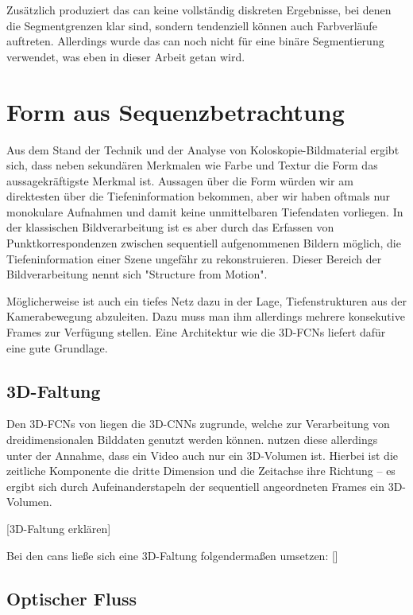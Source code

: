 Zusätzlich produziert das \gls{can} keine vollständig diskreten Ergebnisse, bei denen die Segmentgrenzen klar sind, sondern tendenziell können auch Farbverläufe auftreten.
Allerdings wurde das \gls{can} noch nicht für eine binäre Segmentierung verwendet, was eben in dieser Arbeit getan wird.



\section{Form aus Sequenzbetrachtung}

Aus dem Stand der Technik und der Analyse von Koloskopie-Bildmaterial ergibt sich, dass neben sekundären Merkmalen wie Farbe und Textur die Form das aussagekräftigste Merkmal ist.
Aussagen über die Form würden wir am direktesten über die Tiefeninformation bekommen, aber wir haben oftmals nur monokulare Aufnahmen und damit keine unmittelbaren Tiefendaten vorliegen.
In der klassischen Bildverarbeitung ist es aber durch das Erfassen von Punktkorrespondenzen zwischen sequentiell aufgenommenen Bildern möglich, die Tiefeninformation einer Szene ungefähr zu rekonstruieren.
Dieser Bereich der Bildverarbeitung nennt sich "Structure from Motion".

Möglicherweise ist auch ein tiefes Netz dazu in der Lage, Tiefenstrukturen aus der Kamerabewegung abzuleiten.
Dazu muss man ihm allerdings mehrere konsekutive Frames zur Verfügung stellen.
Eine Architektur wie die 3D-FCNs liefert dafür eine gute Grundlage.

\subsection{3D-Faltung}

Den 3D-FCNs von \cite{Lequan.2017} liegen die 3D-CNNs zugrunde, welche zur Verarbeitung von dreidimensionalen Bilddaten genutzt werden können.
\citeauthor{Lequan.2017} nutzen diese allerdings unter der Annahme, dass ein Video auch nur ein 3D-Volumen ist.
Hierbei ist die zeitliche Komponente die dritte Dimension und die Zeitachse ihre Richtung -- es ergibt sich durch Aufeinanderstapeln der sequentiell angeordneten Frames ein 3D-Volumen.

[3D-Faltung erklären]

Bei den \glspl{can} ließe sich eine 3D-Faltung folgendermaßen umsetzen:
[]

\subsection{Optischer Fluss}


